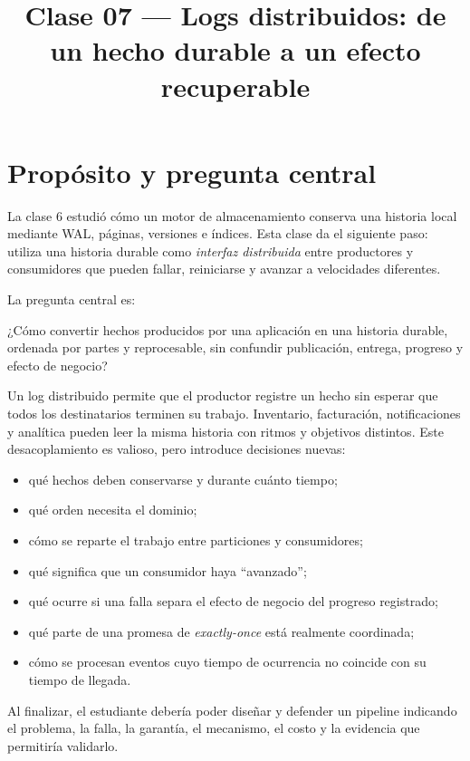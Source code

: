 \documentclass[variant=apuntes,cover=institutional,mode=screen]{ua-engineering-v6-article}
\title{Clase 07 --- Logs distribuidos: de un hecho durable a un efecto recuperable}
\author{\UAProfessor}
\date{\UADate}
\begin{document}
\maketitle

\section{Propósito y pregunta central}

La clase 6 estudió cómo un motor de almacenamiento conserva una historia local mediante WAL, páginas, versiones e índices. Esta clase da el siguiente paso: utiliza una historia durable como \emph{interfaz distribuida} entre productores y consumidores que pueden fallar, reiniciarse y avanzar a velocidades diferentes.

La pregunta central es:

\begin{uakeybox}
¿Cómo convertir hechos producidos por una aplicación en una historia durable, ordenada por partes y reprocesable, sin confundir publicación, entrega, progreso y efecto de negocio?
\end{uakeybox}

Un log distribuido permite que el productor registre un hecho sin esperar que todos los destinatarios terminen su trabajo. Inventario, facturación, notificaciones y analítica pueden leer la misma historia con ritmos y objetivos distintos. Este desacoplamiento es valioso, pero introduce decisiones nuevas:

\begin{itemize}
\item qué hechos deben conservarse y durante cuánto tiempo;
\item qué orden necesita el dominio;
\item cómo se reparte el trabajo entre particiones y consumidores;
\item qué significa que un consumidor haya ``avanzado'';
\item qué ocurre si una falla separa el efecto de negocio del progreso registrado;
\item qué parte de una promesa de \emph{exactly-once} está realmente coordinada;
\item cómo se procesan eventos cuyo tiempo de ocurrencia no coincide con su tiempo de llegada.
\end{itemize}

Al finalizar, el estudiante debería poder diseñar y defender un pipeline indicando el problema, la falla, la garantía, el mecanismo, el costo y la evidencia que permitiría validarlo.
\end{document}
